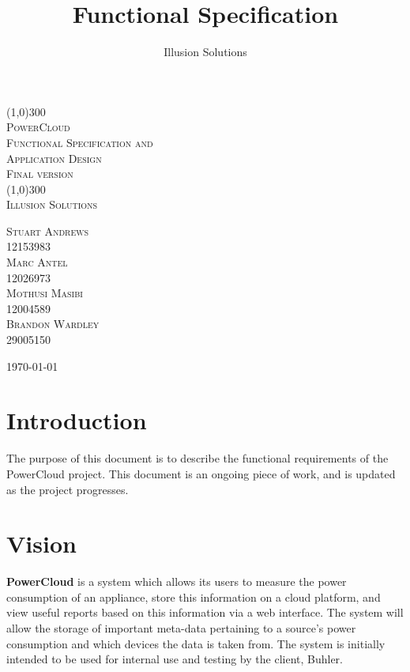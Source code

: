 \documentclass{article}
\title{
	Functional Specification
}
\author{Illusion Solutions}
\begin{document}
	
	\begin{titlepage}
		\begin{center}
			\line(1,0){300} \\
			[0.1cm]
			\textsc{\Huge
				PowerCloud\\
				Functional Specification and\\
				Application Design
			} \\
			\textsc{\large Final version}\\
			[0.1cm]
			\line(1,0){300} \\
			[2.0cm]
			\textsc{\Large
				Illusion Solutions
			} \\
			[3.5cm]
			
		\end{center}
		\begin{flushright}
			\textsc{\Large
				Stuart Andrews\\ 
				12153983\\
				Marc Antel\\
				12026973\\
				Mothusi Masibi\\
				12004589\\
				Brandon Wardley\\
				29005150\\
				[4.0cm]
			}
		\end{flushright}
		\begin{center}
			\today
		\end{center}
	\end{titlepage}
	
	\newpage
	\restoregeometry
	\tableofcontents
	\thispagestyle{empty}
	
	\newpage
	
	\section{Introduction}
	
	The purpose of this document is to describe the functional 
	requirements of the PowerCloud project. This document is an ongoing 
	piece of work, and is updated as the project progresses.
	\section{Vision}
	\textbf{PowerCloud} is a system which allows its users to measure the power consumption of an appliance, store this 
	information on a cloud platform, and view useful reports based on this information via a web interface. The system will 
	allow the storage of important meta-data pertaining to a source's power consumption and which devices the data is taken 
	from. The system is initially intended to be used for internal use and testing by the client, Buhler.\\
	
\end{document}
